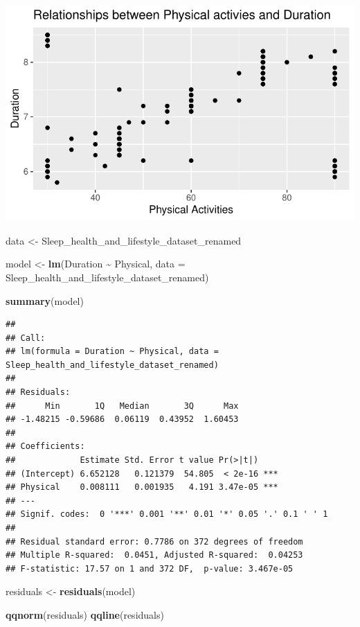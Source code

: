 \documentclass[
  11pt,
]{article}
\newenvironment{Shaded}{\begin{snugshade}}{\end{snugshade}}
\newcommand{\AttributeTok}[1]{\textcolor[rgb]{0.13,0.29,0.53}{#1}}
\newcommand{\FunctionTok}[1]{\textcolor[rgb]{0.13,0.29,0.53}{\textbf{#1}}}
\newcommand{\NormalTok}[1]{#1}
\newcommand{\OtherTok}[1]{\textcolor[rgb]{0.56,0.35,0.01}{#1}}
\newcommand{\SpecialCharTok}[1]{\textcolor[rgb]{0.81,0.36,0.00}{\textbf{#1}}}
\begin{document}
\begin{center}\includegraphics[width=0.7\linewidth]{SleepHelath_files/figure-latex/unnamed-chunk-47-1} \end{center}

\begin{Shaded}
\begin{Highlighting}[]
\NormalTok{data }\OtherTok{\textless{}{-}}\NormalTok{ Sleep\_health\_and\_lifestyle\_dataset\_renamed}

\NormalTok{model }\OtherTok{\textless{}{-}} \FunctionTok{lm}\NormalTok{(Duration }\SpecialCharTok{\textasciitilde{}}\NormalTok{ Physical, }\AttributeTok{data =}\NormalTok{ Sleep\_health\_and\_lifestyle\_dataset\_renamed)}


\FunctionTok{summary}\NormalTok{(model)}
\end{Highlighting}
\end{Shaded}

\begin{verbatim}
## 
## Call:
## lm(formula = Duration ~ Physical, data = Sleep_health_and_lifestyle_dataset_renamed)
## 
## Residuals:
##      Min       1Q   Median       3Q      Max 
## -1.48215 -0.59686  0.06119  0.43952  1.60453 
## 
## Coefficients:
##             Estimate Std. Error t value Pr(>|t|)    
## (Intercept) 6.652128   0.121379  54.805  < 2e-16 ***
## Physical    0.008111   0.001935   4.191 3.47e-05 ***
## ---
## Signif. codes:  0 '***' 0.001 '**' 0.01 '*' 0.05 '.' 0.1 ' ' 1
## 
## Residual standard error: 0.7786 on 372 degrees of freedom
## Multiple R-squared:  0.0451, Adjusted R-squared:  0.04253 
## F-statistic: 17.57 on 1 and 372 DF,  p-value: 3.467e-05
\end{verbatim}

\begin{Shaded}
\begin{Highlighting}[]
\NormalTok{residuals }\OtherTok{\textless{}{-}} \FunctionTok{residuals}\NormalTok{(model)}

\FunctionTok{qqnorm}\NormalTok{(residuals)}
\FunctionTok{qqline}\NormalTok{(residuals)}
\end{Highlighting}
\end{Shaded}
\end{document}
